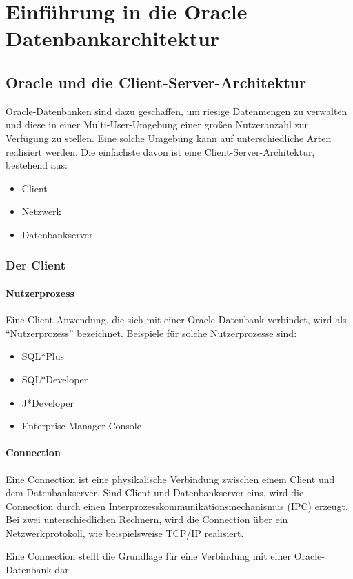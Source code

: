   \chapter{Einf\"uhrung in die Oracle Datenbankarchitektur}
    \setcounter{page}{1}
    \minitoc
\newpage
    \section{Oracle und die Client-Server-Architektur}
      Oracle-Datenbanken sind dazu geschaffen, um riesige Datenmengen zu verwalten und diese in einer Multi-User-Umgebung einer gro\ss{}en Nutzeranzahl zur Verf\"ugung zu stellen. Eine solche Umgebung kann auf unterschiedliche Arten realisiert werden. Die einfachste davon ist eine  Client-Server-Architektur, bestehend aus:
      \begin{itemize}
        \item Client
        \item Netzwerk
        \item Datenbankserver
      \end{itemize}


      \subsection{Der Client}
        \subsubsection{Nutzerprozess}
          Eine Client-Anwendung, die sich mit einer Oracle-Datenbank verbindet, wird als \enquote{Nutzerprozess} bezeichnet. Beispiele f\"ur solche Nutzerprozesse sind:
          \begin{itemize}
            \item SQL*Plus
            \item SQL*Developer
            \item J*Developer
            \item Enterprise Manager Console
          \end{itemize}
        \subsubsection{Connection}
          Eine Connection ist eine physikalische Verbindung zwischen einem Client und dem Datenbankserver. Sind Client und Datenbankserver eins, wird die Connection durch einen Interprozesskommunikationsmechanismus (IPC) erzeugt. Bei zwei unterschiedlichen Rechnern, wird die Connection \"uber ein Netzwerkprotokoll, wie beispielsweise TCP/IP realisiert.
          \begin{merke}
            Eine Connection stellt die Grundlage f\"ur eine Verbindung mit einer Oracle-Datenbank dar.
          \end{merke}
